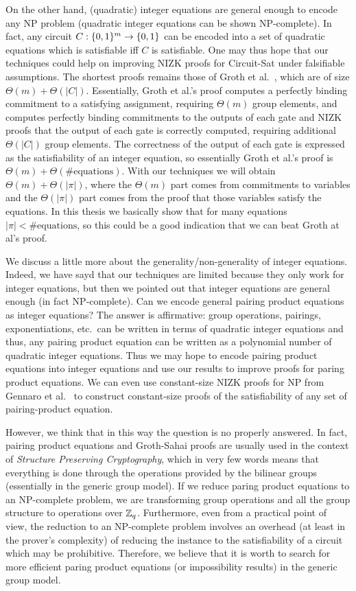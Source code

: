 On the other hand, (quadratic) integer equations are general enough to encode any NP problem (quadratic integer equations can be shown NP-complete). In fact, any circuit $C:\{0,1\}^m\to \{0,1\}$ can be encoded into a set of quadratic equations which is satisfiable iff $C$ is satisfiable.
One may thus hope that our techniques could help on improving NIZK proofs for Circuit-Sat under falsifiable assumptions. The shortest proofs remains those of Groth et al.~\cite{EC:GroOstSah06}, which are of size $\Theta(m)+\Theta(|C|)$. Essentially, Groth et al.'s proof computes a perfectly binding commitment to a satisfying assignment, requiring $\Theta(m)$ group elements, and computes perfectly binding commitments to the outputs of each gate and NIZK proofs that the output of each gate is correctly computed, requiring additional $\Theta(|C|)$ group elements. The correctness of the output of each gate is expressed as the satisfiability of an integer equation, so essentially Groth et al.'s proof is $\Theta(m)+\Theta(\#\mathrm{equations})$.
With our techniques we will obtain $\Theta(m)+\Theta(|\pi|)$, where the $\Theta(m)$ part comes from commitments to variables and the $\Theta(|\pi|)$ part comes from the proof that those variables satisfy the equations. In this thesis we basically show that for many equations $|\pi|< \#\mathrm{equations}$, so this could be a good indication that we can beat Groth at al's proof. 

We discuss a little more about the generality/non-generality of integer equations. Indeed, we have sayd that our techniques are limited because they only work for integer equations, but then we pointed out that integer equations are general enough (in fact NP-complete). Can we encode general pairing product equations as integer equations? The answer is affirmative: group operations, pairings, exponentiations, etc.~can be written in terms of quadratic integer equations and thus, any pairing product equation can be written as a polynomial number of quadratic integer equations. Thus we may hope to encode pairing product equations into integer equations and use our results to improve proofs for paring product equations. We can even use constant-size NIZK proofs for NP from Gennaro et al.~\cite{EC:GGPR13} to construct constant-size proofs of the satisfiability of any set of pairing-product equation.

However, we think that in this way the question is no properly answered. In fact, pairing product equations and Groth-Sahai proofs are usually used in the context of \emph{Structure Preserving Cryptography}, which in very few words means that everything is done through the operations provided by the bilinear groups (essentially in the generic group model). If we reduce paring product equations to an NP-complete problem, we are transforming group operations and all the group structure to operations over $\mathbb{Z}_q$. Furthermore, even from a practical point of view, the reduction to an NP-complete problem involves an overhead (at least in the prover's complexity) of reducing the instance to the satisfiability of a circuit which may be prohibitive. Therefore, we believe that it is worth to search for more efficient paring product equations (or impossibility results) in the generic group model.

